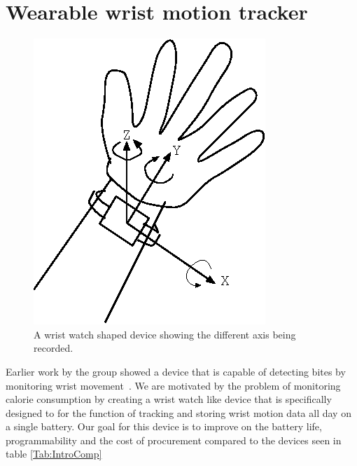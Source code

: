 \section{Wearable wrist motion tracker}
\label{Sec:WearbleTracker}
\begin{figure}
\begin{center}
\includegraphics{images/HandAxis.eps}
\caption{A wrist watch shaped device showing the different axis being recorded.}
\label{fig:HandAxis}
\end{center}
\end{figure}
Earlier work by the group showed a device that is capable of
detecting bites by monitoring wrist movement~\cite{drennan2010assessment}.
We are motivated by the problem of monitoring calorie consumption by
creating a wrist watch like device that is specifically designed
to for the function of tracking and storing wrist motion data all day
on a single battery. Our goal for this device is to improve on the
battery life, programmability and the cost of procurement compared to
the devices seen in table \ref{Tab:IntroComp}
